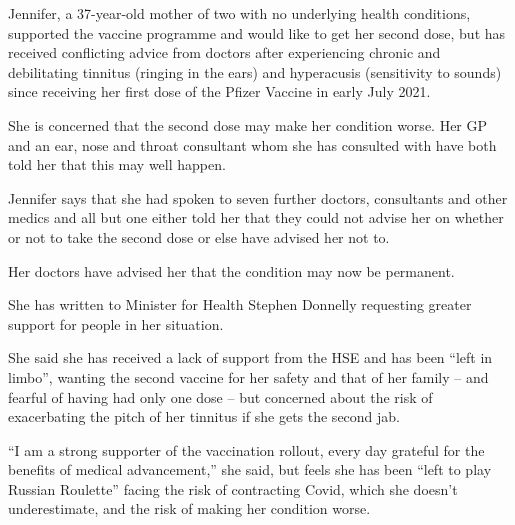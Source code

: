 Jennifer, a 37-year-old mother of two with no underlying health conditions,
supported the vaccine programme and would like to get her second dose, but has
received conflicting advice from doctors after experiencing chronic and
debilitating tinnitus (ringing in the ears) and hyperacusis (sensitivity to
sounds) since receiving her first dose of the Pfizer Vaccine in early July 2021.

She is concerned that the second dose may make her condition worse. Her GP and
an ear, nose and throat consultant whom she has consulted with have both told
her that this may well happen.

Jennifer says that she had spoken to seven further doctors, consultants and
other medics and all but one either told her that they could not advise her on
whether or not to take the second dose or else have advised her not to.

Her doctors have advised her that the condition may now be permanent.

She has written to Minister for Health Stephen Donnelly requesting greater
support for people in her situation.

She said she has received a lack of support from the HSE and has been “left in
limbo”, wanting the second vaccine for her safety and that of her family – and
fearful of having had only one dose – but concerned about the risk of
exacerbating the pitch of her tinnitus if she gets the second jab.

“I am a strong supporter of the vaccination rollout, every day grateful for the
benefits of medical advancement,” she said, but feels she has been “left to play
Russian Roulette” facing the risk of contracting Covid, which she doesn’t
underestimate, and the risk of making her condition worse.

